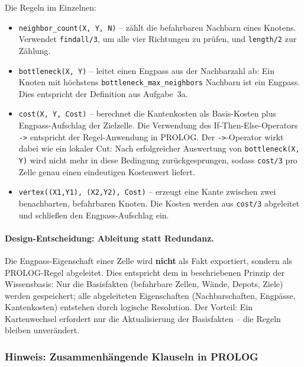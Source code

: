 Die Regeln im Einzelnen:

\begin{itemize}
    \item \texttt{neighbor\_count(X, Y, N)} -- zählt die befahrbaren Nachbarn eines Knotens. Verwendet \texttt{findall/3}, um alle vier Richtungen zu prüfen, und \texttt{length/2} zur Zählung.
    \item \texttt{bottleneck(X, Y)} -- leitet einen Engpass aus der Nachbarzahl ab: Ein Knoten mit höchstens \texttt{bottleneck\_max\_neighbors} Nachbarn ist ein Engpass. Dies entspricht der Definition aus Aufgabe~3a.
    \item \texttt{cost(X, Y, Cost)} -- berechnet die Kantenkosten als Basis-Kosten plus Engpass-Aufschlag der Zielzelle. Die Verwendung des If-Then-Else-Operators \texttt{->} entspricht der Regel-Anwendung in \acs{PROLOG}. Der \texttt{->}-Operator wirkt dabei wie ein lokaler Cut: Nach erfolgreicher Auswertung von \texttt{bottleneck(X, Y)} wird nicht mehr in diese Bedingung zurückgesprungen, sodass \texttt{cost/3} pro Zelle genau einen eindeutigen Kostenwert liefert.
    \item \texttt{vertex((X1,Y1), (X2,Y2), Cost)} -- erzeugt eine Kante zwischen zwei benachbarten, befahrbaren Knoten. Die Kosten werden aus \texttt{cost/3} abgeleitet und schließen den Engpass-Aufschlag ein.
\end{itemize}

\paragraph{Design-Entscheidung: Ableitung statt Redundanz.}
Die Engpass-Eigenschaft einer Zelle wird \textbf{nicht} als Fakt exportiert, sondern als \acs{PROLOG}-Regel abgeleitet. Dies entspricht dem in \textcite[S. 61]{4} beschriebenen Prinzip der Wissensbasis: Nur die Basisfakten (befahrbare Zellen, Wände, Depots, Ziele) werden gespeichert; alle abgeleiteten Eigenschaften (Nachbarschaften, Engpässe, Kantenkosten) entstehen durch logische Resolution. Der Vorteil: Ein Kartenwechsel erfordert nur die Aktualisierung der Basisfakten -- die Regeln bleiben unverändert.


\subsubsection{Hinweis: Zusammenhängende Klauseln in \acs{PROLOG}}
\label{sssec:prolog_discontiguous}

